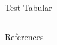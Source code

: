 \documentclass{beamer}
\begin{document}
\begin{frame}[t]
\begin{minipage}[t][0.93\textheight][t]{0.31\textwidth}
\begin{block}{Test Tabular}
        \end{block}
            

        \begin{minipage}[b][0.7\textheight][b]{\textwidth}
            \begin{columns}[b]
                \begin{column}{0.75\columnwidth}
                \begin{block}{References}
                \tiny{
                    
                }
                \end{block}
                \end{column}
                \begin{column}{0.25\columnwidth}
                \begin{figure}[b]
                    \centering
                    
                \end{figure}
                \end{column}
            \end{columns}
        \end{minipage}
    \end{minipage}
    
\end{frame} 
\end{document}
